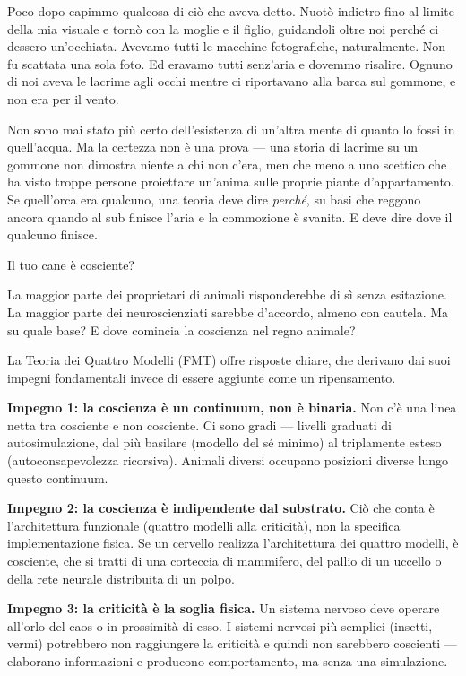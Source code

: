 \documentclass[11pt, twoside, openright]{book}
\begin{document}
Poco dopo capimmo qualcosa di ciò che aveva detto. Nuotò indietro fino al limite della mia visuale e tornò con la moglie e il figlio, guidandoli oltre noi perché ci dessero un'occhiata. Avevamo tutti le macchine fotografiche, naturalmente. Non fu scattata una sola foto. Ed eravamo tutti senz'aria e dovemmo risalire. Ognuno di noi aveva le lacrime agli occhi mentre ci riportavano alla barca sul gommone, e non era per il vento.

Non sono mai stato più certo dell'esistenza di un'altra mente di quanto lo fossi in quell'acqua. Ma la certezza non è una prova --- una storia di lacrime su un gommone non dimostra niente a chi non c'era, men che meno a uno scettico che ha visto troppe persone proiettare un'anima sulle proprie piante d'appartamento. Se quell'orca era qualcuno, una teoria deve dire \textit{perché}, su basi che reggono ancora quando al sub finisce l'aria e la commozione è svanita. E deve dire dove il qualcuno finisce.

Il tuo cane è cosciente?

La maggior parte dei proprietari di animali risponderebbe di sì senza esitazione. La maggior parte dei neuroscienziati sarebbe d'accordo, almeno con cautela. Ma su quale base? E dove comincia la coscienza nel regno animale?

La Teoria dei Quattro Modelli (FMT) offre risposte chiare, che derivano dai suoi impegni fondamentali invece di essere aggiunte come un ripensamento.

\textbf{Impegno 1: la coscienza è un continuum, non è binaria.} Non c'è una linea netta tra cosciente e non cosciente. Ci sono gradi --- livelli graduati di autosimulazione, dal più basilare (modello del sé minimo) al triplamente esteso (autoconsapevolezza ricorsiva). Animali diversi occupano posizioni diverse lungo questo continuum.

\textbf{Impegno 2: la coscienza è indipendente dal substrato.} Ciò che conta è l'architettura funzionale (quattro modelli alla criticità), non la specifica implementazione fisica. Se un cervello realizza l'architettura dei quattro modelli, è cosciente, che si tratti di una corteccia di mammifero, del pallio di un uccello o della rete neurale distribuita di un polpo.

\textbf{Impegno 3: la criticità è la soglia fisica.} Un sistema nervoso deve operare all'orlo del caos o in prossimità di esso. I sistemi nervosi più semplici (insetti, vermi) potrebbero non raggiungere la criticità e quindi non sarebbero coscienti --- elaborano informazioni e producono comportamento, ma senza una simulazione.
\end{document}
